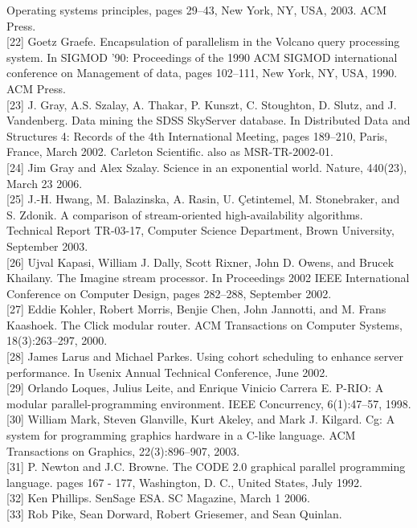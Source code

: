 \documentclass[
]{article}
\begin{document}
Operating systems principles, pages 29--43, New York, NY, USA, 2003. ACM
Press.\\
{[}22{]} Goetz Graefe. Encapsulation of parallelism in the Volcano query
processing system. In SIGMOD '90: Proceedings of the 1990 ACM SIGMOD
international conference on Management of data, pages 102--111, New
York, NY, USA, 1990. ACM Press.\\
{[}23{]} J. Gray, A.S. Szalay, A. Thakar, P. Kunszt, C. Stoughton, D.
Slutz, and J. Vandenberg. Data mining the SDSS SkyServer database. In
Distributed Data and Structures 4: Records of the 4th International
Meeting, pages 189--210, Paris, France, March 2002. Carleton Scientific.
also as MSR-TR-2002-01.\\
{[}24{]} Jim Gray and Alex Szalay. Science in an exponential world.
Nature, 440(23), March 23 2006.\\
{[}25{]} J.-H. Hwang, M. Balazinska, A. Rasin, U. Çetintemel, M.
Stonebraker, and S. Zdonik. A comparison of stream-oriented
high-availability algorithms. Technical Report TR-03-17, Computer
Science Department, Brown University, September 2003.\\
{[}26{]} Ujval Kapasi, William J. Dally, Scott Rixner, John D. Owens,
and Brucek Khailany. The Imagine stream processor. In Proceedings 2002
IEEE International Conference on Computer Design, pages 282--288,
September 2002.\\
{[}27{]} Eddie Kohler, Robert Morris, Benjie Chen, John Jannotti, and M.
Frans Kaashoek. The Click modular router. ACM Transactions on Computer
Systems, 18(3):263--297, 2000.\\
{[}28{]} James Larus and Michael Parkes. Using cohort scheduling to
enhance server performance. In Usenix Annual Technical Conference, June
2002.\\
{[}29{]} Orlando Loques, Julius Leite, and Enrique Vinicio Carrera E.
P-RIO: A modular parallel-programming environment. IEEE Concurrency,
6(1):47--57, 1998.\\
{[}30{]} William Mark, Steven Glanville, Kurt Akeley, and Mark J.
Kilgard. Cg: A system for programming graphics hardware in a C-like
language. ACM Transactions on Graphics, 22(3):896--907, 2003.\\
{[}31{]} P. Newton and J.C. Browne. The CODE 2.0 graphical parallel
programming language. pages 167 - 177, Washington, D. C., United States,
July 1992.\\
{[}32{]} Ken Phillips. SenSage ESA. SC Magazine, March 1 2006.\\
{[}33{]} Rob Pike, Sean Dorward, Robert Griesemer, and Sean Quinlan.
\end{document}
